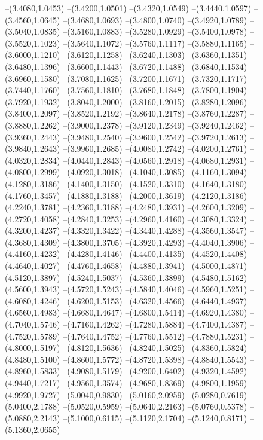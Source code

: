 {\begin{scope}
--(3.4080,1.0453)
--(3.4200,1.0501)
--(3.4320,1.0549)
--(3.4440,1.0597)
--(3.4560,1.0645)
--(3.4680,1.0693)
--(3.4800,1.0740)
--(3.4920,1.0789)
--(3.5040,1.0835)
--(3.5160,1.0883)
--(3.5280,1.0929)
--(3.5400,1.0978)
--(3.5520,1.1023)
--(3.5640,1.1072)
--(3.5760,1.1117)
--(3.5880,1.1165)
--(3.6000,1.1210)
--(3.6120,1.1258)
--(3.6240,1.1303)
--(3.6360,1.1351)
--(3.6480,1.1396)
--(3.6600,1.1443)
--(3.6720,1.1488)
--(3.6840,1.1534)
--(3.6960,1.1580)
--(3.7080,1.1625)
--(3.7200,1.1671)
--(3.7320,1.1717)
--(3.7440,1.1760)
--(3.7560,1.1810)
--(3.7680,1.1848)
--(3.7800,1.1904)
--(3.7920,1.1932)
--(3.8040,1.2000)
--(3.8160,1.2015)
--(3.8280,1.2096)
--(3.8400,1.2097)
--(3.8520,1.2192)
--(3.8640,1.2178)
--(3.8760,1.2287)
--(3.8880,1.2262)
--(3.9000,1.2378)
--(3.9120,1.2349)
--(3.9240,1.2462)
--(3.9360,1.2443)
--(3.9480,1.2540)
--(3.9600,1.2542)
--(3.9720,1.2613)
--(3.9840,1.2643)
--(3.9960,1.2685)
--(4.0080,1.2742)
--(4.0200,1.2761)
--(4.0320,1.2834)
--(4.0440,1.2843)
--(4.0560,1.2918)
--(4.0680,1.2931)
--(4.0800,1.2999)
--(4.0920,1.3018)
--(4.1040,1.3085)
--(4.1160,1.3094)
--(4.1280,1.3186)
--(4.1400,1.3150)
--(4.1520,1.3310)
--(4.1640,1.3180)
--(4.1760,1.3457)
--(4.1880,1.3188)
--(4.2000,1.3619)
--(4.2120,1.3186)
--(4.2240,1.3781)
--(4.2360,1.3188)
--(4.2480,1.3931)
--(4.2600,1.3209)
--(4.2720,1.4058)
--(4.2840,1.3253)
--(4.2960,1.4160)
--(4.3080,1.3324)
--(4.3200,1.4237)
--(4.3320,1.3422)
--(4.3440,1.4288)
--(4.3560,1.3547)
--(4.3680,1.4309)
--(4.3800,1.3705)
--(4.3920,1.4293)
--(4.4040,1.3906)
--(4.4160,1.4232)
--(4.4280,1.4146)
--(4.4400,1.4135)
--(4.4520,1.4408)
--(4.4640,1.4027)
--(4.4760,1.4658)
--(4.4880,1.3941)
--(4.5000,1.4871)
--(4.5120,1.3897)
--(4.5240,1.5037)
--(4.5360,1.3899)
--(4.5480,1.5162)
--(4.5600,1.3943)
--(4.5720,1.5243)
--(4.5840,1.4046)
--(4.5960,1.5251)
--(4.6080,1.4246)
--(4.6200,1.5153)
--(4.6320,1.4566)
--(4.6440,1.4937)
--(4.6560,1.4983)
--(4.6680,1.4647)
--(4.6800,1.5414)
--(4.6920,1.4380)
--(4.7040,1.5746)
--(4.7160,1.4262)
--(4.7280,1.5884)
--(4.7400,1.4387)
--(4.7520,1.5789)
--(4.7640,1.4752)
--(4.7760,1.5512)
--(4.7880,1.5231)
--(4.8000,1.5197)
--(4.8120,1.5636)
--(4.8240,1.5025)
--(4.8360,1.5824)
--(4.8480,1.5100)
--(4.8600,1.5772)
--(4.8720,1.5398)
--(4.8840,1.5543)
--(4.8960,1.5833)
--(4.9080,1.5179)
--(4.9200,1.6402)
--(4.9320,1.4592)
--(4.9440,1.7217)
--(4.9560,1.3574)
--(4.9680,1.8369)
--(4.9800,1.1959)
--(4.9920,1.9727)
--(5.0040,0.9830)
--(5.0160,2.0959)
--(5.0280,0.7619)
--(5.0400,2.1788)
--(5.0520,0.5959)
--(5.0640,2.2163)
--(5.0760,0.5378)
--(5.0880,2.2143)
--(5.1000,0.6115)
--(5.1120,2.1704)
--(5.1240,0.8171)
--(5.1360,2.0655)

\end{scope}}
